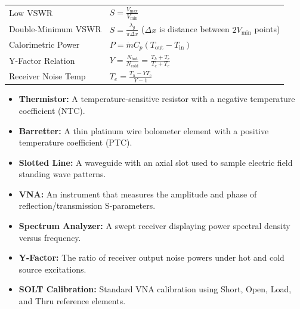 \documentclass[12pt,a4paper]{article}
\renewcommand{\arraystretch}{1.45}
\begin{document}
\begin{tcolorbox}[formulabox, title={\textbf{Key Formulas at a Glance}}]
\renewcommand{\arraystretch}{1.3}
\begin{tabularx}{\linewidth}{B{4.5cm} X}Low VSWR                & $S = \frac{V_{\text{max}}}{V_{\text{min}}}$ \\[4pt]
Double-Minimum VSWR     & $S = \frac{\lambda_g}{\pi \Delta x}$ \quad ($\Delta x$ is distance between $2V_{\text{min}}$ points) \\[4pt]
Calorimetric Power      & $P = \dot{m} C_p (T_{\text{out}} - T_{\text{in}})$ \\[4pt]
Y-Factor Relation       & $Y = \frac{N_{\text{hot}}}{N_{\text{cold}}} = \frac{T_h+T_e}{T_c+T_e}$ \\[4pt]
Receiver Noise Temp     & $T_e = \frac{T_h - Y T_c}{Y - 1}$
\end{tabularx}
\end{tcolorbox}

\begin{tcolorbox}[defbox, title={\textbf{One-Line Definitions}}]
\begin{itemize}[leftmargin=*, itemsep=2.5pt, topsep=0pt]
  \item \textbf{Thermistor:} A temperature-sensitive resistor with a negative temperature coefficient (NTC).
  \item \textbf{Barretter:} A thin platinum wire bolometer element with a positive temperature coefficient (PTC).
  \item \textbf{Slotted Line:} A waveguide with an axial slot used to sample electric field standing wave patterns.
  \item \textbf{VNA:} An instrument that measures the amplitude and phase of reflection/transmission S-parameters.
  \item \textbf{Spectrum Analyzer:} A swept receiver displaying power spectral density versus frequency.
  \item \textbf{Y-Factor:} The ratio of receiver output noise powers under hot and cold source excitations.
  \item \textbf{SOLT Calibration:} Standard VNA calibration using Short, Open, Load, and Thru reference elements.
\end{itemize}
\end{tcolorbox}
\end{document}
